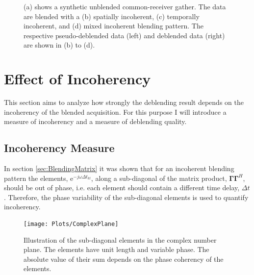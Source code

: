 \begin{figure}
	\caption{(a) shows a synthetic unblended common-receiver gather. The data are blended with a (b) spatially incoherent, (c) temporally incoherent, and (d) mixed incoherent blending pattern. The respective pseudo-deblended data (left) and deblended data (right) are shown in (b) to (d).}
	\label{fig:Ch-Results-Debl-x-inline}

\end{figure}


\FloatBarrier
\section{Effect of Incoherency} \label{sec:Effect-of-Incoherency}

This section aims to analyze how strongly the deblending result depends on the incoherency of the blended acquisition. For this purpose I will introduce a measure of incoherency and a measure of deblending quality.

\subsection*{Incoherency Measure}



In section \ref{sec:BlendingMatrix} it was shown that for an incoherent blending pattern the elements, $\mathrm{e}^{-j \omega \Delta t_{kl}}$, along a sub-diagonal of the matrix product, $\mathbf{\Gamma \Gamma}^H$, should be out of phase, i.e. each element should contain a different time delay, $\Delta t$. Therefore, the phase variability of the sub-diagonal elements is used to quantify incoherency. 

\begin{figure}
	\centering
	\texttt{[image: Plots/ComplexPlane]}
	\caption{Illustration of the sub-diagonal elements in the complex number plane. The elements have unit length and variable phase. The absolute value of their sum depends on the phase coherency of the elements.}
	\label{fig:Ch-Results-complex-circle}
\end{figure}

